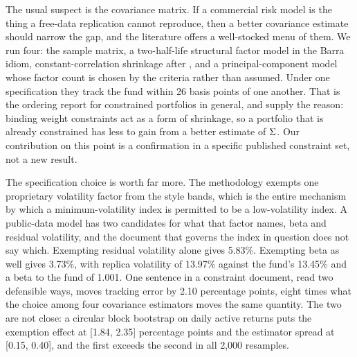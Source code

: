 The usual suspect is the covariance matrix. If a commercial risk model is the
thing a free-data replication cannot reproduce, then a better covariance
estimate should narrow the gap, and the literature offers a well-stocked menu
of them. We run four: the sample matrix, a two-half-life structural factor
model in the Barra idiom, constant-correlation shrinkage after
\citet{ledoit2003improved}, and a principal-component model whose factor count
is chosen by the \citet{bai2002determining} criteria rather than assumed. Under
one specification they track the fund within 26 basis points of one another. That is the ordering \citet{dom2025beyond} report for constrained
portfolios in general, and \citet{jagannathan2003risk} supply the reason:
binding weight constraints act as a form of shrinkage, so a portfolio that is
already constrained has less to gain from a better estimate of $\Sigma$. Our
contribution on this point is a confirmation in a specific published
constraint set, not a new result.

The specification choice is worth far more. The methodology exempts one
proprietary volatility factor from the style bands, which is the entire
mechanism by which a minimum-volatility index is permitted to be a
low-volatility index. A public-data model has two candidates for what that
factor names, beta and residual volatility, and the document that governs the
index in question does not say which. Exempting residual volatility alone gives
5.83\%. Exempting beta as well gives 3.73\%, with replica volatility of 13.97\%
against the fund's 13.45\% and a beta to the fund of 1.001. One sentence in a
constraint document, read two defensible ways, moves tracking error by 2.10
percentage points, eight times what the choice among four covariance estimators
moves the same quantity. The two are not close: a circular block bootstrap on
daily active returns puts the exemption effect at [1.84, 2.35] percentage
points and the estimator spread at [0.15, 0.40], and the first exceeds the
second in all 2{,}000 resamples.

